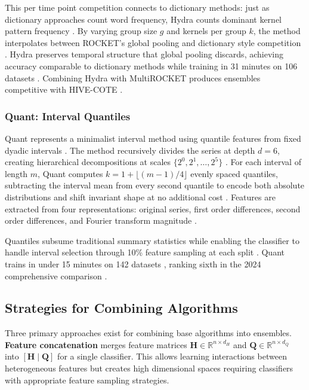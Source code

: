 \documentclass[pdflatex,sn-basic]{sn-jnl}           %
\theoremstyle{thmstyleone}%
\theoremstyle{thmstyletwo}%
\theoremstyle{thmstylethree}%
\begin{document}
This per time point competition connects to dictionary methods: just as dictionary approaches count word frequency, Hydra counts dominant kernel pattern frequency \citep[p.~1786]{hydra}. By varying group size $g$ and kernels per group $k$, the method interpolates between ROCKET's global pooling and dictionary style competition \citep[Figure~2, p.~1791]{hydra}. Hydra preserves temporal structure that global pooling discards, achieving accuracy comparable to dictionary methods while training in 31 minutes on 106 datasets \citep[p.~1781]{hydra}. Combining Hydra with MultiROCKET produces ensembles competitive with HIVE-COTE \citep[pp.~1796--1797]{hydra}.

\subsubsection{Quant: Interval Quantiles}

Quant represents a minimalist interval method using quantile features from fixed dyadic intervals \citep{quant}. The method recursively divides the series at depth $d=6$, creating hierarchical decompositions at scales $\{2^0, 2^1, \ldots, 2^5\}$ \citep[p.~2384]{quant}. For each interval of length $m$, Quant computes $k = 1 + \lfloor (m-1)/4 \rfloor$ evenly spaced quantiles, subtracting the interval mean from every second quantile to encode both absolute distributions and shift invariant shape at no additional cost \citep[p.~2385, Figure~4, p.~2386]{quant}. Features are extracted from four representations: original series, first order differences, second order differences, and Fourier transform magnitude \citep[Section~3.1, p.~2384]{quant}.

Quantiles subsume traditional summary statistics \citep[p.~2378]{quant} while enabling the classifier to handle interval selection through 10\% feature sampling at each split \citep[Section~4.2.6, p.~2387]{quant}. Quant trains in under 15 minutes on 142 datasets \citep[p.~2390]{quant}, ranking sixth in the 2024 comprehensive comparison \citep[Table~14, p.~2008]{bakeoff-redux}.

\subsection{Strategies for Combining Algorithms}

Three primary approaches exist for combining base algorithms into ensembles. \textbf{Feature concatenation} merges feature matrices $\mathbf{H} \in \mathbb{R}^{n \times d_H}$ and $\mathbf{Q} \in \mathbb{R}^{n \times d_Q}$ into $[\mathbf{H} \mid \mathbf{Q}]$ for a single classifier. This allows learning interactions between heterogeneous features but creates high dimensional spaces requiring classifiers with appropriate feature sampling strategies.
\end{document}
